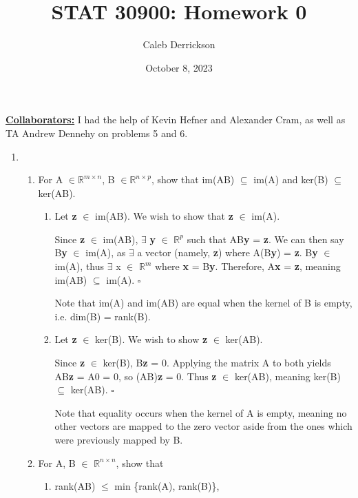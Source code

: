 \documentclass[12pt]{article}
\title{STAT 30900: Homework 0}
\author{Caleb Derrickson}
\date{October 8, 2023}
\newcommand{\hop}{\vspace{1mm}}
\newcommand{\jump}{\vspace{5mm}}
\newcommand{\R}{\mathbb{R}}
\newcommand{\bt}{\textbf}
\begin{document}
\onehalfspacing
\maketitle
\textbf{\underline{Collaborators:}} I had the help of Kevin Hefner and Alexander Cram,  as well as TA Andrew Dennehy on problems 5 and 6.
\begin{enumerate}[leftmargin=\labelsep]


\item 
\begin{enumerate}
    \hop
    \item For A $\in \R ^{m \times n}$, B $\in \R^{ n \times p}$, show that im(AB) $\subseteq$ im(A) and ker(B) $\subseteq$ ker(AB).
        \jump
        
    \begin{enumerate}
        \item Let \bt{z} $\in$ im(AB). We wish to show that \bt{z} $\in$ im(A). 
    \hop
    
    Since \bt{z} $\in$ im(AB), $\exists$ \bt{y} $\in$ $\R^{p}$ such that AB\bt{y} = \bt{z}. We can then say B\bt{y} $\in$ im(A), as $\exists$ a vector (namely, \bt{z}) where A(B\bt{y}) = \bt{z}. B\bt{y} $\in$ im(A), thus $\exists$ x $\in$ $\R^{m}$ where \bt{x} = B\bt{y}. Therefore, A\bt{x} = \bt{z}, meaning im(AB) $\subseteq$ im(A). $\square$

    Note that im(A) and im(AB) are equal when the kernel of B is empty, i.e. dim(B) = rank(B).
    
    \hop
    
    \item Let \textbf{z} $\in$ ker(B). We wish to show \textbf{z} $\in$ ker(AB).
    \hop

    Since \textbf{z} $\in$ ker(B), B\textbf{z} = 0. Applying the matrix A to both yields AB\textbf{z} = A0 = 0, so (AB)\textbf{z} = 0. Thus \textbf{z} $\in$ ker(AB), meaning ker(B) $\subseteq$ ker(AB). $\square$

    \hop
    Note that equality occurs when the kernel of A is empty, meaning no other vectors are mapped to the zero vector aside from the ones which were previously mapped by B.
    \end{enumerate}    

    \jump

    \item For A, B $\in$ $\R^{n\times n}$, show that
    \begin{enumerate}
        \item rank(AB) $\leq$ min \{rank(A), rank(B)\}, 
        \jump


\end{enumerate}
\end{enumerate}
\end{enumerate}
\end{document}
